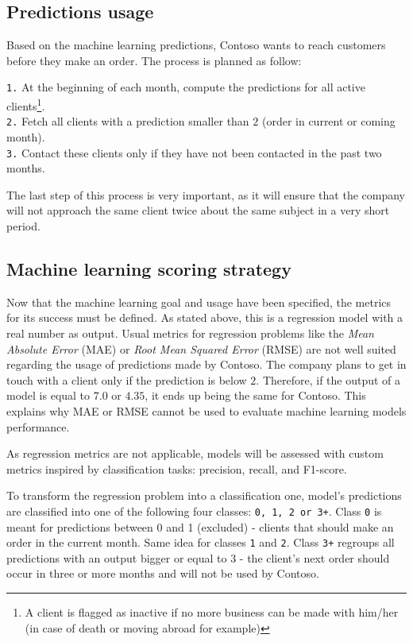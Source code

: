 \subsection{Predictions usage}
Based on the machine learning predictions, Contoso wants to reach customers before they make an order. The process is planned as follow:

\noindent\hspace*{0.8cm}  \texttt{1.} At the beginning of each month, compute the predictions for all active clients\footnote{A client is flagged as inactive if no more business can be made with him/her (in case of death or moving abroad for example)}. \\
\hspace*{0.8cm}           \texttt{2.} Fetch all clients with a prediction smaller than $2$ (order in current or coming month). \\
\hspace*{0.8cm}           \texttt{3.} Contact these clients only if they have not been contacted in the past two months.

The last step of this process is very important, as it will ensure that the company will not approach the same client twice about the same subject in a very short period.


\subsection{Machine learning scoring strategy}
Now that the machine learning goal and usage have been specified, the metrics for its success must be defined. As stated above, this is a regression model with a real number as output. Usual metrics for regression problems like the \textit{Mean Absolute Error} (MAE) or \textit{Root Mean Squared Error} (RMSE) are not well suited regarding the usage of predictions made by Contoso. The company plans to get in touch with a client only if the prediction is below $2$. Therefore, if the output of a model is equal to $7.0$ or $4.35$, it ends up being the same for Contoso. This explains why MAE or RMSE cannot be used to evaluate machine learning models performance. 

As regression metrics are not applicable, models will be assessed with custom metrics inspired by classification tasks: precision, recall, and F1-score. 

To transform the regression problem into a classification one, model's predictions are classified into one of the following four classes: \texttt{0, 1, 2 or 3+}. Class \texttt{0} is meant for predictions between 0 and 1 (excluded) - clients that should make an order in the current month. Same idea for classes \texttt{1} and \texttt{2}. Class \texttt{3+} regroups all predictions with an output bigger or equal to 3 - the client's next order should occur in three or more months and will not be used by Contoso.

